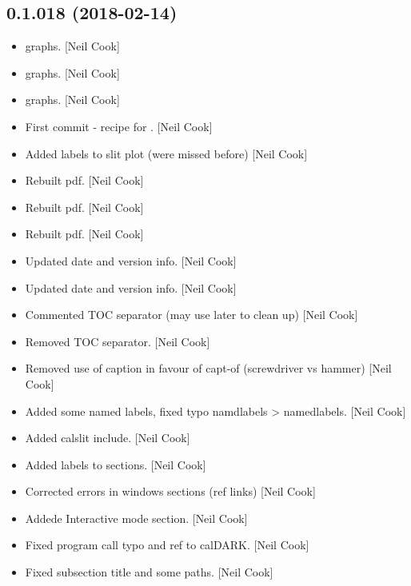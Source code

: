 \documentclass[a4paper,10pt,english]{report}
\begin{document}
\subsection{0.1.018 (2018-02-14)}
\label{\detokenize{misc/changelog:id485}}\begin{itemize}
\item {} 
 graphs. {[}Neil Cook{]}

\item {} 
 graphs. {[}Neil Cook{]}

\item {} 
 graphs. {[}Neil Cook{]}

\item {} 
First commit - recipe for . {[}Neil Cook{]}

\item {} 
Added labels to slit plot (were missed before) {[}Neil Cook{]}

\item {} 
Rebuilt pdf. {[}Neil Cook{]}

\item {} 
Rebuilt pdf. {[}Neil Cook{]}

\item {} 
Rebuilt pdf. {[}Neil Cook{]}

\item {} 
Updated date and version info. {[}Neil Cook{]}

\item {} 
Updated date and version info. {[}Neil Cook{]}

\item {} 
Commented TOC separator (may use later to clean up) {[}Neil Cook{]}

\item {} 
Removed TOC separator. {[}Neil Cook{]}

\item {} 
Removed use of caption in favour of capt-of (screwdriver vs hammer)
{[}Neil Cook{]}

\item {} 
Added some named labels, fixed typo namdlabels \textendash{}\textgreater{} namedlabels. {[}Neil
Cook{]}

\item {} 
Added calslit include. {[}Neil Cook{]}

\item {} 
Added labels to sections. {[}Neil Cook{]}

\item {} 
Corrected errors in windows sections (ref links) {[}Neil Cook{]}

\item {} 
Addede Interactive mode section. {[}Neil Cook{]}

\item {} 
Fixed program call typo and ref to calDARK. {[}Neil Cook{]}

\item {} 
Fixed subsection title and some paths. {[}Neil Cook{]}

\end{itemize}
\end{document}
